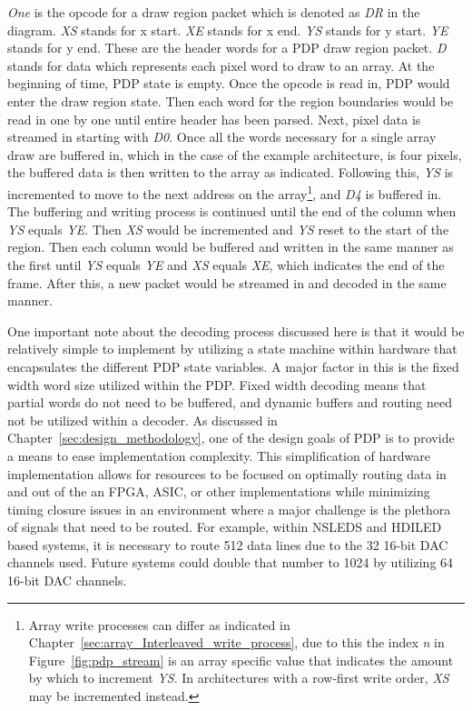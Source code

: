     {\it One} is the opcode for a draw region packet which is denoted as {\it DR} in the diagram. {\it XS} stands for x start. {\it XE} stands for x end. {\it YS} stands for y start. {\it YE} stands for y end. These are the header words for a PDP draw region packet. {\it D} stands for data which represents each pixel word to draw to an array. At the beginning of time, PDP state is empty. Once the opcode is read in, PDP would enter the draw region state. Then each word for the region boundaries would be read in one by one until entire header has been parsed. Next, pixel data is streamed in starting with {\it D0}. Once all the words necessary for a single array draw are buffered in, which in the case of the example architecture, is four pixels, the buffered data is then written to the array as indicated. Following this, {\it YS} is incremented to move to the next address on the array\footnote{Array write processes can differ as indicated in Chapter~\ref{sec:array_Interleaved_write_process}, due to this the index {\it n} in Figure~\ref{fig:pdp_stream} is an array specific value that indicates the amount by which to increment {\it YS}. In architectures with a row-first write order, {\it XS} may be incremented instead.}, and {\it D4} is buffered in. The buffering and writing process is continued until the end of the column when {\it YS} equals {\it YE}. Then {\it XS} would be incremented and {\it YS} reset to the start of the region. Then each column would be buffered and written in the same manner as the first until {\it YS} equals {\it YE} and {\it XS} equals {\it XE}, which indicates the end of the frame. After this, a new packet would be streamed in and decoded in the same manner.

    One important note about the decoding process discussed here is that it would be relatively simple to implement by utilizing a state machine within hardware that encapsulates the different PDP state variables. A major factor in this is the fixed width word size utilized within the PDP. Fixed width decoding means that partial words do not need to be buffered, and dynamic buffers and routing need not be utilized within a decoder. As discussed in Chapter~\ref{sec:design_methodology}, one of the design goals of PDP is to provide a means to ease implementation complexity. This simplification of hardware implementation allows for resources to be focused on optimally routing data in and out of the an FPGA, ASIC, or other implementations while minimizing timing closure issues in an environment where a major challenge is the plethora of signals that need to be routed. For example, within NSLEDS and HDILED based systems, it is necessary to route 512 data lines due to the 32 16-bit DAC channels used. Future systems could double that number to 1024 by utilizing 64 16-bit DAC channels.

